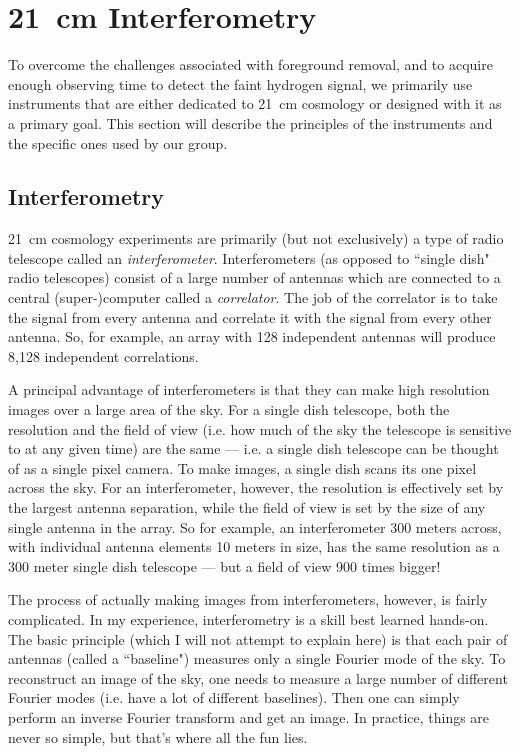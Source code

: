 \chapter{21\ cm Interferometry}
\label{ch2}

To overcome the challenges associated with foreground removal, and to acquire enough observing time
to detect the faint hydrogen signal, we primarily use instruments that are either
dedicated to 21\ cm cosmology or designed with it as a primary goal.  This section will describe
the principles of the instruments and the specific ones used by our group.

\section{Interferometry}

21\ cm cosmology experiments are primarily (but not exclusively) a type of radio telescope called an
\emph{interferometer}.  Interferometers (as opposed to ``single dish" radio telescopes) consist of a
large number of antennas which are connected to a central (super-)computer called a \emph{correlator}.
The job of the correlator is to take the signal from every antenna and correlate it with the 
signal from every other antenna.  So, for example, an array with 128 independent antennas will
produce 8,128 independent correlations.  

A principal advantage of interferometers is that they can make high resolution images over a large
area of the sky.  For a single dish telescope, both the resolution and the field of view
(i.e. how much of the sky the telescope is sensitive to at any given time) are the same --- i.e.
a single dish telescope can be thought of as a single pixel camera.  To make images, a single dish
scans its one pixel across the sky.  For an interferometer, however, 
the resolution is effectively set by the largest antenna separation, while the field of view is
set by the size of any single antenna in the array.  So for example, an interferometer 300 meters
across, with individual antenna elements 10 meters in size, has the same resolution as a 300 meter
single dish telescope --- but a field of view 900 times bigger!

The process of actually making images from interferometers, however, is fairly complicated.  In my
experience, interferometry is a skill best learned hands-on.  The basic principle (which I will not
attempt to explain here) is that each
pair of antennas (called a ``baseline") measures only a single Fourier mode of the sky.  To reconstruct
an image of the sky, one needs to measure a large number of different Fourier modes (i.e. have a lot of
different baselines).  Then one can simply perform an inverse Fourier transform and get an image.
In practice, things are never so simple, but that's where all the fun lies.


